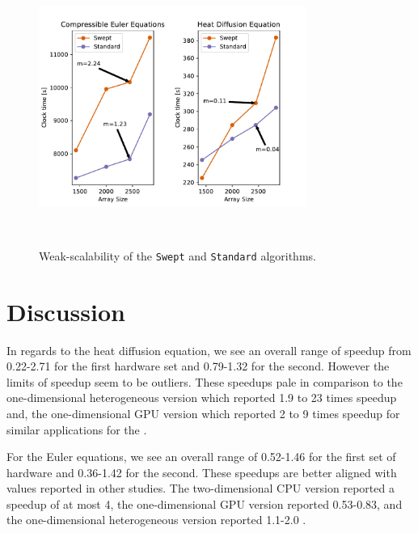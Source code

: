 \documentclass[preprints,article,accept,moreauthors,pdftex]{Definitions/mdpi}
\def\Swept{\texttt{Swept}}
\def\Standard{\texttt{Standard}}
\begin{document}
\begin{figure}[H]
    
    \begin{center}
        \includegraphics[height=9cm,width=0.78\textwidth, trim={0.1cm 0.25cm 1cm 0.5cm},clip]{figs/weakScalability.pdf}
        \caption{Weak-scalability of the \Swept{} and \Standard{} algorithms.}
        \label{fig:scalability}
    \end{center}
\end{figure}




\section{Discussion}
\label{discussion-section}
In regards to the heat diffusion equation, we see an overall range of speedup from 0.22-2.71 for the first hardware set and 0.79-1.32 for the second. However the limits of speedup seem to be outliers. These speedups pale in comparison to the one-dimensional heterogeneous version which reported 1.9 to 23 times speedup and, the one-dimensional GPU version which reported 2 to 9 times speedup for similar applications for the  \cite{Magee2018AcceleratingDecomposition,Magee2020ApplyingSystems}. 

For the Euler equations, we see an overall range of 0.52-1.46 for the first set of hardware and 0.36-1.42 for the second. These speedups are better aligned with values reported in other studies. The two-dimensional CPU version reported a speedup of at most 4, the one-dimensional GPU version reported 0.53-0.83, and the one-dimensional heterogeneous version reported 1.1-2.0 \cite{Alhubail2018ThePDEs,Magee2018AcceleratingDecomposition,Magee2020ApplyingSystems}.
\end{document}

